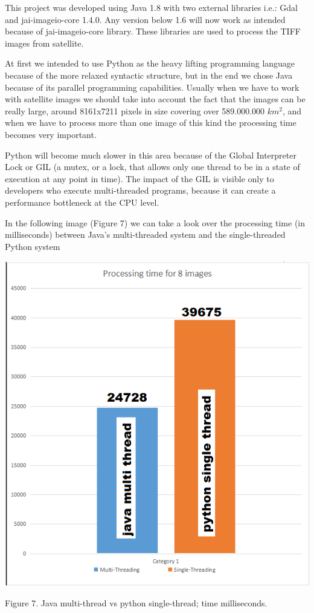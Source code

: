\documentclass[12pt, a4paper]{report}
\begin{document}
This project was developed using Java 1.8 with two external libraries i.e.: Gdal and jai-imageio-core 1.4.0. Any version below 1.6 will now work as intended because of jai-imageio-core library. These libraries are used to process the TIFF images from satellite.
\par

At first we intended to use Python as the heavy lifting programming language because of the more relaxed syntactic structure, but in the end we chose Java because of its parallel programming capabilities. Usually when we have to work with satellite images we should take into account the fact that the images can be really large, around 8161x7211 pixels in size covering over 589.000.000 $km^2$, and when we have to process more than one image of this kind the processing time becomes very important.
\par

Python will become much slower in this area because of the Global Interpreter Lock or GIL (a mutex, or a lock, that allows only one thread to be in a state of execution at any point in time). The impact of the GIL is visible only to developers who execute multi-threaded programs, because it can create a performance bottleneck at the CPU level.
 \par
 
\bigskip

In the following image (Figure 7) we can take a look over the processing time (in milliseconds) between Java's multi-threaded system and the single-threaded Python system
\par

\bigskip


\par 
\includegraphics[scale=0.7, center]{multi_thread2.png}
\begin{center}
Figure 7. Java multi-thread vs python single-thread; time milliseconds.
\end{center}
\end{document}
